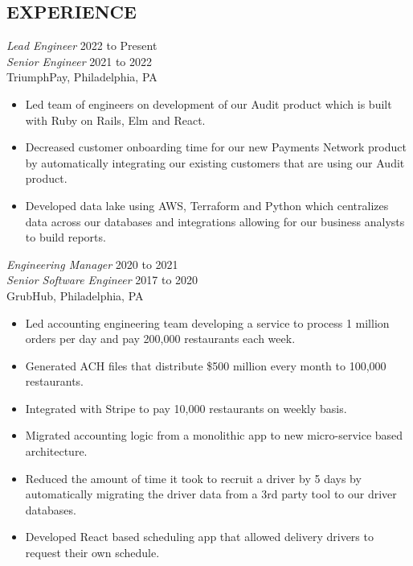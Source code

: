 \documentclass[line]{style}
\begin{document}
\newsectionwidth{0in}

\address{michaelcdalton@gmail.com}
\address{linkedin.com/in/michaelcdalton}

\begin{resume}

\section{EXPERIENCE}

{\sl Lead Engineer} \hfill 2022 to Present \\
{\sl Senior Engineer} \hfill 2021 to 2022 \\
TriumphPay, Philadelphia, PA
\begin{itemize} \itemsep -2pt
\item Led team of engineers on development of our Audit product which is built with Ruby on Rails, Elm and React.
\item Decreased customer onboarding time for our new Payments Network product by automatically integrating our existing customers that are using our Audit product.
\item Developed data lake using AWS, Terraform and Python which centralizes data across our databases and integrations allowing for our business analysts to build reports.
\end{itemize}

{\sl Engineering Manager} \hfill 2020 to 2021 \\
{\sl Senior Software Engineer} \hfill 2017 to 2020 \\
GrubHub, Philadelphia, PA
\begin{itemize} \itemsep -2pt
\item Led accounting engineering team developing a service to process 1 million orders per day and pay 200,000 restaurants each week.
\item Generated ACH files that distribute \$500 million every month to 100,000 restaurants.
\item Integrated with Stripe to pay 10,000 restaurants on weekly basis.
\item Migrated accounting logic from a monolithic app to new micro-service based architecture.
\item Reduced the amount of time it took to recruit a driver by 5 days by automatically migrating the driver data from a 3rd party tool to our driver databases.
\item Developed React based scheduling app that allowed delivery drivers to request their own schedule.
\end{itemize}


\end{resume}
\end{document}
